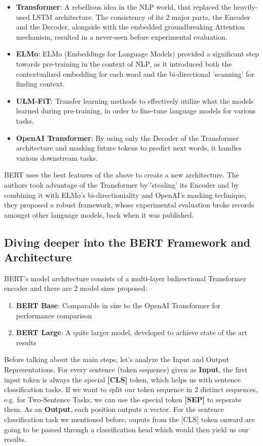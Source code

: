 \documentclass[a4paper,12pt]{article}
\begin{document}
\begin{itemize}
    \item \textbf{Transformer}: A rebellious idea in the NLP world, that replaced the heavily-used LSTM architecture. The consistency of its 2 major parts, the Encoder and the Decoder, alongside with the embedded groundbreaking Attention mechanism, resulted in a never-seen before experimental evaluation.
    \item \textbf{ELMo}: ELMo (Embeddings for Language Models) provided a significant step towards pre-training in the context of NLP, as it introduced both the contextualized embedding for each word and the bi-directional 'scanning' for finding context.
    \item \textbf{ULM-FiT}: Transfer learning methods to effectively utilize what the models learned during pre-training, in order to fine-tune language models for various tasks.
    \item \textbf{OpenAI Transformer}: By using only the Decoder of the Transformer architecture and masking future tokens to predict next words, it handles various downstream tasks.
\end{itemize}

BERT uses the best features of the above to create a new architecture. The authors took advantage of the Transformer by 'stealing' its Encoder and by combining it with ELMo's bi-directioniality and OpenAI's masking technique, they proposed a robust framework, whose experimental evaluation broke records amongst other language models, back when it was published.

\subsection{Diving deeper into the BERT Framework and Architecture}
BERT's model architecture consists of  a multi-layer bidirectional Transformer encoder and there are 2 model sizes proposed:

\begin{enumerate}
    \item \textbf{BERT Base}: Comparable in size to the OpenAI Transformer for performance comparison
    \item \textbf{BERT Large}: A quite larger model, developed to achieve state of the art results
\end{enumerate}


Before talking about the main steps, let's analyze the Input and Output Representations. 
For every sentence (token sequence) given as  \textbf{Input}, the first input token is always the special \textbf{[CLS]} token, which helps us with sentence classification tasks. If we want to split our token sequence in 2 distinct sequences, e.g. for Two-Sentence Tasks, we can use the special token \textbf{[SEP]} to seperate them. As an \textbf{Output}, each position outputs a vector. For the sentence classification task we mentioned before, ouputs from the [CLS] token onward are going to be passed through a classification head which would then yield us our results. \\
\end{document}
